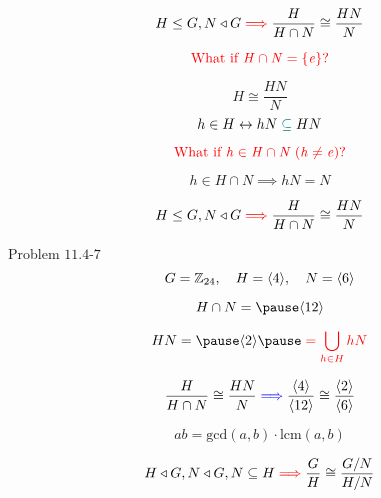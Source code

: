 \begin{frame}
  \begin{theorem}
	\[
	  H \le G, N \triangleleft G \textcolor{red}{\implies} \frac{H}{H \cap N} \cong \frac{HN}{N} 
	\]
  \end{theorem}

  \pause
  \[
	\textcolor{red}{\it \text{What if } H \cap N = \left\{e\right\}?}
  \]

  \pause
  \[
	H \cong \frac{HN}{N}
  \]
  \pause
  \[
	h \in H \leftrightarrow hN \;\textcolor{teal}{\subseteq}\; HN 
  \]

  \pause
  \[
	\textcolor{red}{\it \text{What if } h \in H \cap N\; (h \neq e)?}
  \]
  
  \pause
  \[
	h \in H \cap N \implies hN = N
  \]
\end{frame}

\begin{frame}
  \begin{theorem}
	\[
	  H \le G, N \triangleleft G \textcolor{red}{\implies} \frac{H}{H \cap N} \cong \frac{HN}{N} 
	\]
  \end{theorem}

  \vspace{0.20cm}
  \begin{exampleblock}{Problem $11.4$-$7$}
	\[
	  G = \mathbb{Z}_{24},\quad H = \langle 4 \rangle,\quad N = \langle 6 \rangle
	\]
  \end{exampleblock}

  \pause
  \[
	H \cap N = \pause \langle 12 \rangle
  \]

  \pause
  \vspace{-0.80cm}
  \[
	HN = \pause \langle 2 \rangle \pause \;\red{= \bigcup_{h \in H} hN}
  \]

  \pause
  \[
	\frac{H}{H \cap N} \cong \frac{HN}{N} \textcolor{blue}{\implies} 
	\frac{\langle 4 \rangle}{\langle 12 \rangle} \cong \frac{\langle 2 \rangle}{\langle 6 \rangle}
  \]

  \pause
  \[
	ab = \text{gcd}(a, b) \cdot \text{lcm}(a,b)
  \]
\end{frame}

\begin{frame}
  \begin{theorem}
	\[
	  H \triangleleft G, N \triangleleft G, N \subseteq H \textcolor{red}{\implies} \frac{G}{H} \cong \frac{G/N}{H/N}
	\]
  \end{theorem}

  \begin{columns}
	  \pause
	  \pause
  \end{columns}
\end{frame}

